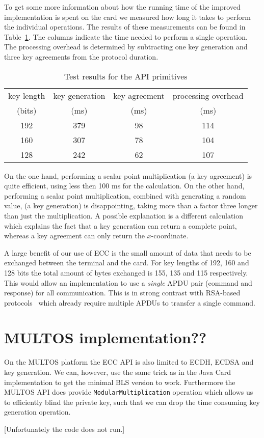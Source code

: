 To get some more information about how the running time of the improved
implementation is spent on the card we measured how long it takes to perform the
individual operations. The results of these measurements can be found in
Table~\ref{tab:primitives}. The columns indicate the time needed to perform a
single operation. The processing overhead is determined by subtracting one key
generation and three key agreements from the protocol duration.

\begin{table}
  \centering
  \caption{Test results for the API primitives}
  \label{tab:primitives}
  \renewcommand{\tabcolsep}{1.25mm}
  \renewcommand{\arraystretch}{1.25}
  \begin{tabular}{| c || c | c | c |}\hline
    key length & key generation & key agreement & processing overhead \\
    (bits) & (ms) & (ms) & (ms) \\\hline
    \hline
    192 & 379 & 98 & 114 \\\hline
    160 & 307 & 78 & 104 \\\hline
    128 & 242 & 62 & 107 \\\hline
  \end{tabular}
\end{table}

On the one hand, performing a scalar point multiplication (a key agreement) is
quite efficient, using less then 100 ms for the calculation. On the other hand,
performing a scalar point multiplication, combined with generating a random
value, (a key generation) is disappointing, taking more than a factor three
longer than just the multiplication. A possible explanation is a different
calculation which explains the fact that a key generation can return a complete
point, whereas a key agreement can only return the $x$-coordinate.

A large benefit of our use of ECC is the small amount of data that needs to be
exchanged between the terminal and the card. For key lengths of 192, 160 and 128
bits the total amount of bytes exchanged is 155, 135 and 115 respectively. This
would allow an implementation to use a \emph{single} APDU pair (command and
response) for all communication. This is in strong contrast with RSA-based
protocols~\cite{Sterckx09,TewsJacobs09} which already require multiple APDUs to
transfer a single command.

\section{MULTOS implementation??}

On the MULTOS platform the ECC API is also limited to ECDH, ECDSA and key
generation. We can, however, use the same trick as in the Java Card
implementation to get the minimal BLS version to work. Furthermore the MULTOS
API does provide \texttt{ModularMultiplication} operation which allows us to
efficiently blind the private key, such that we can drop the time consuming key
generation operation.

[Unfortunately the code does not run.]